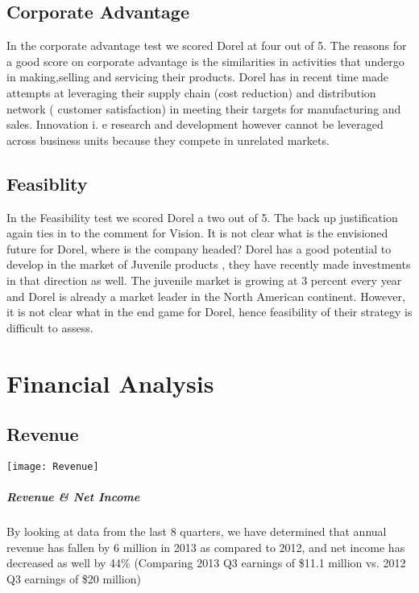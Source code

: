 \section{Corporate Advantage}
In the corporate advantage test we scored Dorel at four out of 5. The reasons for a good score on corporate advantage is the similarities in activities that undergo in making,selling and servicing their products. Dorel has in recent time made attempts at leveraging their supply chain (cost reduction) and distribution network ( customer satisfaction) in meeting their targets for manufacturing and sales. Innovation i. e  research and development however cannot be leveraged across business units because they compete in unrelated markets.

\section{Feasiblity}
In the Feasibility test we scored Dorel a two out of 5. The back up justification again ties in to the comment for Vision. It is not clear what is the envisioned future for Dorel, where is the company headed? Dorel has a good potential to develop in the market of Juvenile products , they have recently made investments in that direction as well. The juvenile market is growing at 3 percent every year and Dorel is already a market leader in the North American continent. However, it is not clear what in the end game for Dorel, hence feasibility of their strategy is difficult to assess.

\chapter{Financial Analysis}
\label{chp:financials}
\section{Revenue}
\texttt{[image: Revenue]}
\paragraph{Revenue \& Net Income}By looking at data from the last 8 quarters, we have determined that annual revenue has fallen by 6 million in 2013 as compared to 2012, and net income has decreased as well by 44\% (Comparing 2013 Q3 earnings of \$11.1 million vs. 2012 Q3 earnings of \$20 million) 
\\[1\baselineskip]

